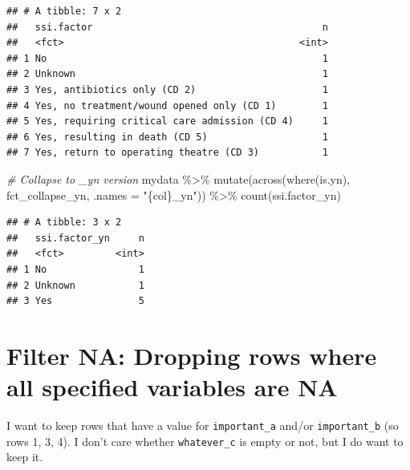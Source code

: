\documentclass[
]{book}
\newenvironment{Shaded}{\begin{snugshade}}{\end{snugshade}}
\newcommand{\AttributeTok}[1]{\textcolor[rgb]{0.77,0.63,0.00}{#1}}
\newcommand{\CommentTok}[1]{\textcolor[rgb]{0.56,0.35,0.01}{\textit{#1}}}
\newcommand{\FunctionTok}[1]{\textcolor[rgb]{0.00,0.00,0.00}{#1}}
\newcommand{\NormalTok}[1]{#1}
\newcommand{\SpecialCharTok}[1]{\textcolor[rgb]{0.00,0.00,0.00}{#1}}
\newcommand{\StringTok}[1]{\textcolor[rgb]{0.31,0.60,0.02}{#1}}
\begin{document}
\begin{verbatim}
## # A tibble: 7 x 2
##   ssi.factor                                        n
##   <fct>                                         <int>
## 1 No                                                1
## 2 Unknown                                           1
## 3 Yes, antibiotics only (CD 2)                      1
## 4 Yes, no treatment/wound opened only (CD 1)        1
## 5 Yes, requiring critical care admission (CD 4)     1
## 6 Yes, resulting in death (CD 5)                    1
## 7 Yes, return to operating theatre (CD 3)           1
\end{verbatim}

\begin{Shaded}
\begin{Highlighting}[]
\CommentTok{\# Collapse to \_yn version}
\NormalTok{mydata }\SpecialCharTok{\%\textgreater{}\%} 
  \FunctionTok{mutate}\NormalTok{(}\FunctionTok{across}\NormalTok{(}\FunctionTok{where}\NormalTok{(is.yn), fct\_collapse\_yn, }\AttributeTok{.names =} \StringTok{"\{col\}\_yn"}\NormalTok{)) }\SpecialCharTok{\%\textgreater{}\%} 
  \FunctionTok{count}\NormalTok{(ssi.factor\_yn)}
\end{Highlighting}
\end{Shaded}

\begin{verbatim}
## # A tibble: 3 x 2
##   ssi.factor_yn     n
##   <fct>         <int>
## 1 No                1
## 2 Unknown           1
## 3 Yes               5
\end{verbatim}

\hypertarget{filter-na-dropping-rows-where-all-specified-variables-are-na}{%
\section{Filter NA: Dropping rows where all specified variables are NA}\label{filter-na-dropping-rows-where-all-specified-variables-are-na}}

I want to keep rows that have a value for \texttt{important\_a} and/or \texttt{important\_b} (so rows 1, 3, 4).
I don't care whether \texttt{whatever\_c} is empty or not, but I do want to keep it.
\end{document}
